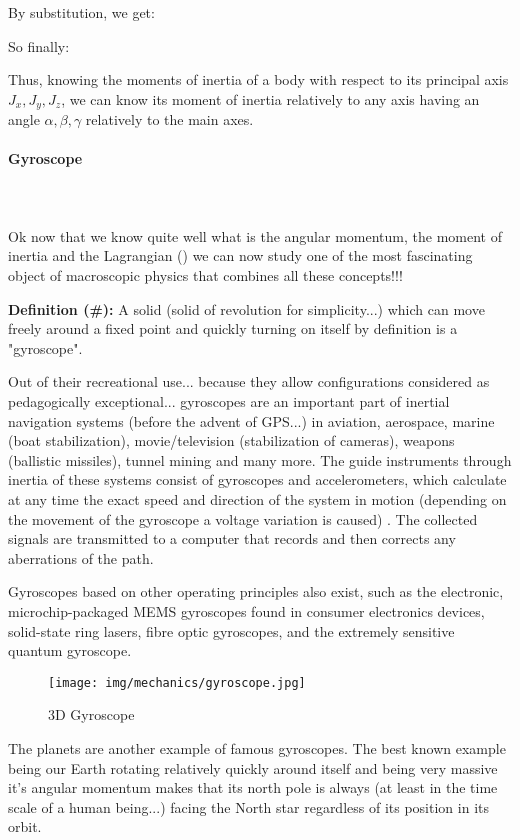      By substitution, we get:
     
    So finally:
    
    Thus, knowing the moments of inertia of a body with respect to its principal axis $J_x,J_y,J_z$, we can know its moment of inertia relatively to any axis having an angle $\alpha,\beta,\gamma$ relatively to the main axes.
    
     \paragraph{Gyroscope}\mbox{}\\\\
     Ok now that we know quite well what is the angular momentum, the moment of inertia and the Lagrangian () we can now study one of the most fascinating object of macroscopic physics that combines all these concepts!!!
     
     \textbf{Definition (\#\mydef):} A solid (solid of revolution for simplicity...) which can move freely around a fixed point and quickly turning on itself by definition is a "gyroscope".

	Out of their recreational use... because they allow configurations considered as pedagogically exceptional... gyroscopes are an important part of inertial navigation systems (before the advent of GPS...) in aviation, aerospace, marine (boat stabilization), movie/television (stabilization of cameras), weapons (ballistic missiles),  tunnel mining and many more. The guide instruments through inertia of these systems consist of gyroscopes and accelerometers, which calculate at any time the exact speed and direction of the system in motion (depending on the movement of the gyroscope a voltage variation is caused) . The collected signals are transmitted to a computer that records and then corrects any aberrations of the path.

	\begin{tcolorbox}[title=Remark,colframe=black,arc=10pt]
	Gyroscopes based on other operating principles also exist, such as the electronic, microchip-packaged MEMS gyroscopes found in consumer electronics devices, solid-state ring lasers, fibre optic gyroscopes, and the extremely sensitive quantum gyroscope.
	\end{tcolorbox}
	\begin{figure}[H]
		\centering
		\texttt{[image: img/mechanics/gyroscope.jpg]}
		\caption{3D Gyroscope}
	\end{figure}
	The planets are another example of famous gyroscopes. The best known example being our Earth rotating relatively quickly around itself and being very massive it's angular momentum makes that its north pole is always (at least in the time scale of a human being...) facing the North star regardless of its position in its orbit.
	
